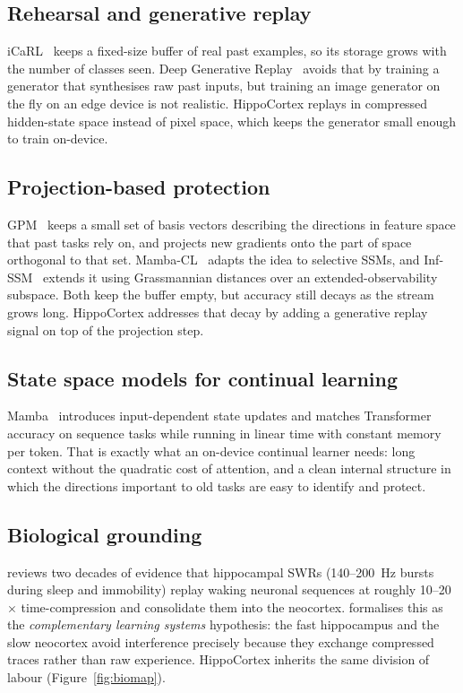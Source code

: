 \documentclass[11pt,a4paper]{article}
\begin{document}
\subsection{Rehearsal and generative replay}
iCaRL~\citep{rebuffi2017icarl} keeps a fixed-size buffer of real past examples, so its storage grows with the number of classes seen. Deep Generative Replay~\citep{shin2017continual} avoids that by training a generator that synthesises raw past inputs, but training an image generator on the fly on an edge device is not realistic. HippoCortex replays in compressed hidden-state space instead of pixel space, which keeps the generator small enough to train on-device.

\subsection{Projection-based protection}
GPM~\citep{saha2021gradient} keeps a small set of basis vectors describing the directions in feature space that past tasks rely on, and projects new gradients onto the part of space orthogonal to that set. Mamba-CL~\citep{cheng2024mambacl} adapts the idea to selective SSMs, and Inf-SSM~\citep{lee2025exemplarfree} extends it using Grassmannian distances over an extended-observability subspace. Both keep the buffer empty, but accuracy still decays as the stream grows long. HippoCortex addresses that decay by adding a generative replay signal on top of the projection step.

\subsection{State space models for continual learning}
Mamba~\citep{gu2023mamba} introduces input-dependent state updates and matches Transformer accuracy on sequence tasks while running in linear time with constant memory per token. That is exactly what an on-device continual learner needs: long context without the quadratic cost of attention, and a clean internal structure in which the directions important to old tasks are easy to identify and protect.

\subsection{Biological grounding}
\citet{buzsaki2015hippocampal} reviews two decades of evidence that hippocampal SWRs (140--200~Hz bursts during sleep and immobility) replay waking neuronal sequences at roughly 10--20$\times$ time-compression and consolidate them into the neocortex. \citet{mcclelland1995complementary} formalises this as the \emph{complementary learning systems} hypothesis: the fast hippocampus and the slow neocortex avoid interference precisely because they exchange compressed traces rather than raw experience. HippoCortex inherits the same division of labour (Figure~\ref{fig:biomap}).
\end{document}
